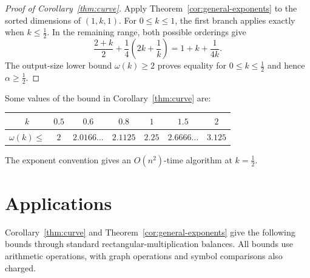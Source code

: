 \documentclass[11pt]{article}
\begin{document}
\begin{proof}[Proof of Corollary~\ref{thm:curve}]
Apply Theorem~\ref{cor:general-exponents} to the sorted dimensions
of $(1,k,1)$. For $0\le k\le1$, the first branch applies exactly when
$k\le\frac{1}{2}$. In the remaining range, both possible orderings give
\[
 \frac{2+k}{2}+\frac{1}{4}\left(2k+\frac1k\right)
 =1+k+\frac1{4k}.
\]
The output-size lower bound $\omega(k)\ge2$ proves equality for
$0\le k\le\frac{1}{2}$ and hence $\alpha\ge\frac{1}{2}$.
\end{proof}

Some values of the bound in Corollary~\ref{thm:curve} are:
\begin{center}
\begin{tabular}{ccccccc}
\toprule
$k$ & $0.5$ & $0.6$ & $0.8$ & $1$ & $1.5$ & $2$\\
\midrule
$\omega(k)\le$ & $2$ & $2.0166\ldots$ & $2.1125$ & $2.25$ & $2.6666\ldots$ & $3.125$\\
\bottomrule
\end{tabular}
\end{center}
The exponent convention gives an $O(n^2)$-time
algorithm at $k=\frac{1}{2}$.


\section{Applications}\label{sec:applications}

Corollary~\ref{thm:curve} and Theorem~\ref{cor:general-exponents} give the following bounds through standard
rectangular-multiplication balances. All bounds use arithmetic
operations, with graph operations and symbol comparisons also charged.
\end{document}
